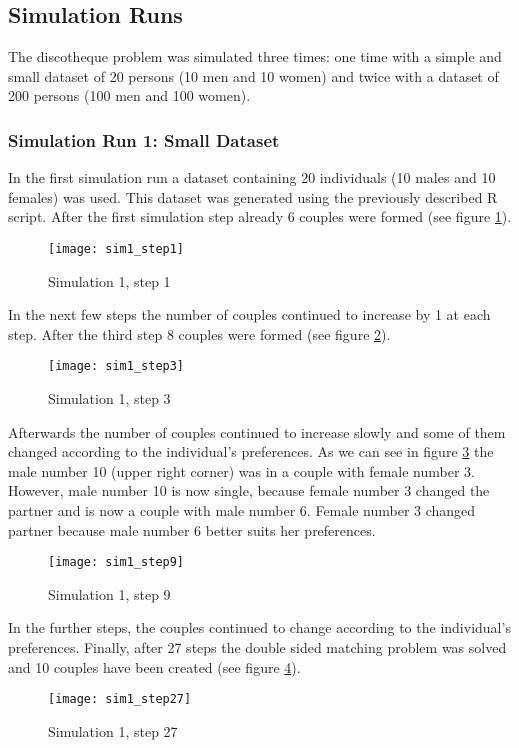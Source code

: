 \clearpage
\subsection{Simulation Runs}
The discotheque problem was simulated three times: one time with a simple and small dataset of 20 persons (10 men and 10 women) and twice with a dataset of 200 persons (100 men and 100 women).

\subsubsection{Simulation Run 1: Small Dataset}
In the first simulation run a dataset containing 20 individuals (10 males and 10 females) was used. 
This dataset was generated using the previously described R script.
After the first simulation step already 6 couples were formed (see figure \ref{fig:sim1_step1}).
\begin{figure}[H]
  \centering
  \texttt{[image: sim1\_step1]}
	\caption{Simulation 1, step 1}
	\label{fig:sim1_step1}
\end{figure}

In the next few steps the number of couples continued to increase by 1 at each step. 
After the third step 8 couples were formed (see figure \ref{fig:sim1_step3}).
\begin{figure}[H]
  \centering
  \texttt{[image: sim1\_step3]}
	\caption{Simulation 1, step 3}
	\label{fig:sim1_step3}
\end{figure}

Afterwards the number of couples continued to increase slowly and some of them changed according to the individual's preferences. 
As we can see in figure \ref{fig:sim1_step9} the male number 10 (upper right corner) was in a couple with female number 3. 
However, male number 10 is now single, because female number 3 changed the partner and is now a couple with male number 6. 
Female number 3 changed partner because male number 6 better suits her preferences.
\begin{figure}[H]
  \centering
  \texttt{[image: sim1\_step9]}
	\caption{Simulation 1, step 9}
	\label{fig:sim1_step9}
\end{figure}

In the further steps, the couples continued to change according to the individual's preferences. 
Finally, after 27 steps the double sided matching problem was solved and 10 couples have been created (see figure \ref{fig:sim1_step27}).
\begin{figure}[H]
  \centering
  \texttt{[image: sim1\_step27]}
	\caption{Simulation 1, step 27}
	\label{fig:sim1_step27}
\end{figure}

